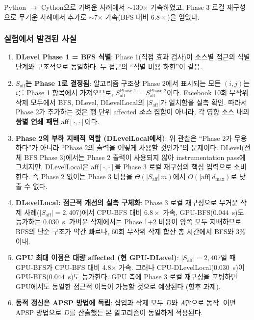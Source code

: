 \documentclass[11pt,a4paper]{article}
\begin{document}
Python $\to$ Cython으로 가벼운 사례에서 $\sim$130$\times$ 가속하였고, Phase 3 로컬 재구성으로 무거운 사례에서 추가로 $\sim$7$\times$ 가속(BFS 대비 $6.8\times$)을 얻었다.

\subsubsection{실험에서 발견된 사실}

\begin{enumerate}[leftmargin=1.4em]
  \item \textbf{DLevel Phase 1 = BFS 식별}: Phase 1(직접 효과 검사)이 소스별 접근의 식별 단계와 구조적으로 동일하다. 두 접근의 ``식별 비용 하한''이 같음.

  \item \textbf{$S_{\text{aff}}$는 Phase 1로 결정됨}: 알고리즘 구조상 Phase 2에서 표시되는 모든 $(i,j)$는 $i$를 Phase 1 항목에서 가져오므로, $S_{\text{aff}}^{\text{Phase 1}} = S_{\text{aff}}^{\text{Phase 2}}$이다. Facebook 10회 무작위 삭제 모두에서 BFS, DLevel, DLevelLocal의 $|S_{\text{aff}}|$가 일치함을 실측 확인. 따라서 Phase 2가 추가하는 것은 행 단위 affected \emph{소스} 집합이 아니라, 각 영향 소스 내의 \textbf{쌍별 연쇄 패턴} $\mathrm{aff}[\cdot,\cdot]$이다.

  \item \textbf{Phase 2의 부하 지배적 역할 (DLevelLocal에서)}: 위 관찰은 ``Phase 2가 무용하다''가 아니라 ``Phase 2의 출력을 어떻게 사용할 것인가''의 문제이다. DLevel(전체 BFS Phase 3)에서는 Phase 2 출력이 사용되지 않아 instrumentation pass에 그치지만, DLevelLocal은 $\mathrm{aff}[\cdot,\cdot]$을 Phase 3 로컬 재구성의 핵심 입력으로 소비한다. 즉 Phase 2 없이는 Phase 3 비용을 $\Theta(|S_{\text{aff}}|\,m)$에서 $O(|\mathrm{aff}|\,d_{\max})$로 낮출 수 없다.

  \item \textbf{DLevelLocal: 점근적 개선의 실측 구체화}: Phase 3 로컬 재구성으로 무거운 삭제 사례($|S_{\text{aff}}|=2{,}407$)에서 CPU-BFS 대비 $6.8\times$ 가속, GPU-BFS($0.044$~s)도 능가하는 $0.030$~s. 가벼운 삭제에서는 Phase 1+2 비용이 양쪽 모두 지배하므로 BFS의 단순 구조가 약간 빠르나, 60회 무작위 삭제 합산 총 시간에서 BFS와 $3\%$ 이내.

  \item \textbf{GPU 최대 이점은 대량 affected (현 GPU-DLevel)}: $|S_{\text{aff}}| = 2{,}407$일 때 GPU-BFS가 CPU-BFS 대비 4.8$\times$ 가속. 그러나 CPU-DLevelLocal($0.030$~s)이 GPU-BFS($0.044$~s)도 능가한다. GPU 측에 Phase 3 로컬 재구성을 포팅하면 GPU에서도 동일한 점근적 이득이 가능할 것으로 예상된다 (향후 과제).

  \item \textbf{동적 갱신은 APSP 방법에 독립}: 삽입과 삭제 모두 $D$와 $A$만으로 동작. 어떤 APSP 방법으로 $D$를 산출했든 본 알고리즘이 동일하게 적용된다.
\end{enumerate}
\end{document}
